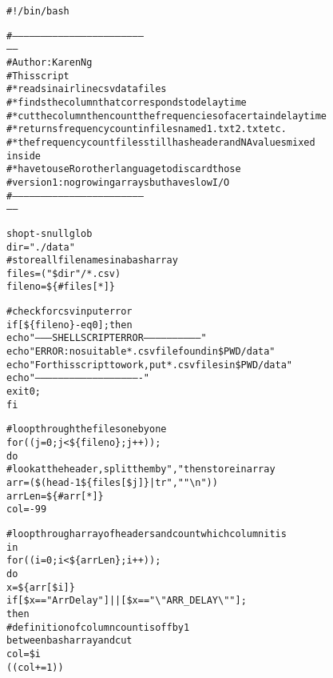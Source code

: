 \documentclass[letterpaper,10pt,english]{/usr/local/lib/python2.7/dist-packages/sphinx/texinputs/sphinxhowto}
\newenvironment{InvisibleVerbatim}
        {\begin{mdframed}[leftmargin=0.1\linewidth,innerleftmargin=3pt,innerrightmargin=3pt, userdefinedwidth=1\linewidth, linewidth=0pt, linecolor=white, usetwoside=false]}
        {\end{mdframed}}
\begin{document}
    

        
        

            
                \begin{InvisibleVerbatim}
                \vspace{-0.5\baselineskip}
\begin{alltt}\#!/bin/bash

\#---------------------------------------------------------------------
------
\# Author: Karen Ng
\# This script
\# * reads in airline csv data files
\# * finds the column that corresponds to delay time
\# * cut the column then count the frequencies of a certain delay time
\# * returns frequency count in files named 1.txt 2.txt etc.
\# * the frequency count files still has header and NA values mixed
inside
\# * have to use R or other language to discard those
\# version 1: no growing arrays but have slow I/O
\#---------------------------------------------------------------------
------

shopt -s nullglob
dir="./data"
\# store all file names in a bash array
files=( "\$dir"/*.csv )
fileno=\$\{\#files[*]\}

\# check for csv input error
if [ \$\{fileno\} -eq 0 ]; then
        echo "--------SHELL SCRIPT ERROR-----------------------------"
        echo "ERROR: no suitable *.csv file found in \$PWD/data"
        echo "For this script to work, put *.csv files in \$PWD/data"
        echo "-------------------------------------------------------"
        exit 0;
fi

\# loop through the files one by one
for ((j=0; j < \$\{fileno\}; j++));
do
        \# look at the header, split them by "," then store in array
        arr=(\$(head -1 \$\{files[\$j]\} | tr "," "\textbackslash{}n"))
        arrLen=\$\{\#arr[*]\}
        col=-99

        \# loop through array of headers and count which column it is
in
        for ((i=0; i < \$\{arrLen\}; i++));
        do
                x=\$\{arr[\$i]\}
                if [ \$x == "ArrDelay" ] || [ \$x == "\textbackslash{}"ARR\_DELAY\textbackslash{}"" ];
then
                        \# definition of column count is off by 1
between bash array and cut
                        col=\$i
                        (( col += 1 ))


\end{alltt}
\end{InvisibleVerbatim}
\end{document}
